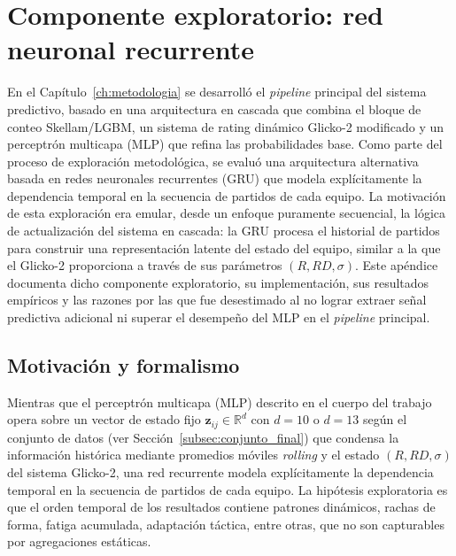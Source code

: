 
\chapter{Componente exploratorio: red neuronal recurrente}
\label{app:gru}

En el Cap\'itulo~\ref{ch:metodologia} se desarroll\'o el \textit{pipeline} principal del sistema predictivo, basado en una arquitectura en cascada que combina el bloque de conteo Skellam/LGBM, un sistema de rating din\'amico Glicko-2 modificado y un perceptr\'on multicapa (MLP) que refina las probabilidades base. Como parte del proceso de exploraci\'on metodol\'ogica, se evalu\'o una arquitectura alternativa basada en redes neuronales recurrentes (GRU)  que modela expl\'icitamente la dependencia temporal en la secuencia de partidos de cada equipo. La motivaci\'on de esta exploraci\'on era emular, desde un enfoque puramente secuencial, la l\'ogica de actualizaci\'on del sistema en cascada: la GRU procesa el historial de partidos para construir una representaci\'on latente del estado del equipo, similar a la que el Glicko-2 proporciona a trav\'es de sus par\'ametros \((R, RD, \sigma)\). Este ap\'endice documenta dicho componente exploratorio, su implementaci\'on, sus resultados emp\'iricos y las razones por las que fue desestimado al no lograr extraer se\~nal predictiva adicional ni superar el desempe\~no del MLP en el \textit{pipeline} principal.


\section{Motivaci\'on y formalismo}
\label{sec:app_gru_formalismo}

Mientras que el perceptr\'on multicapa (MLP) descrito en el cuerpo del trabajo opera sobre un vector de estado fijo $\mathbf{z}_{ij}\in\mathbb{R}^{d}$ con $d=10$ o $d=13$ seg\'un el conjunto de datos (ver Secci\'on~\ref{subsec:conjunto_final}) que condensa la informaci\'on hist\'orica mediante promedios m\'oviles \textit{rolling} y el estado $(R,RD,\sigma)$ del sistema Glicko-2, una red recurrente modela expl\'icitamente la dependencia temporal en la secuencia de partidos de cada equipo. La hip\'otesis exploratoria es que el orden temporal de los resultados contiene patrones din\'amicos, rachas de forma, fatiga acumulada, adaptaci\'on t\'actica, entre otras, que no son capturables por agregaciones est\'aticas.

